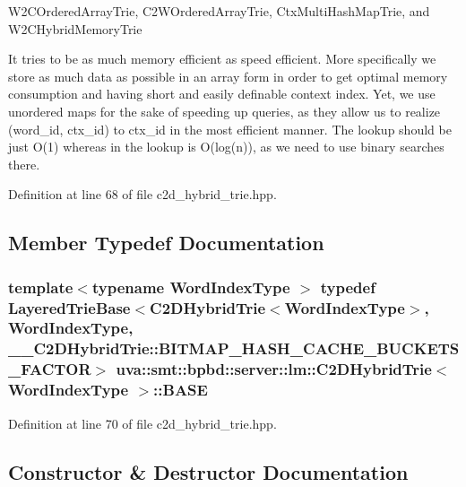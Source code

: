 W2\+C\+Ordered\+Array\+Trie, C2\+W\+Ordered\+Array\+Trie, Ctx\+Multi\+Hash\+Map\+Trie, and W2\+C\+Hybrid\+Memory\+Trie

It tries to be as much memory efficient as speed efficient. More specifically we store as much data as possible in an array form in order to get optimal memory consumption and having short and easily definable context index. Yet, we use unordered maps for the sake of speeding up queries, as they allow us to realize (word\+\_\+id, ctx\+\_\+id) to ctx\+\_\+id in the most efficient manner. The lookup should be just O(1) whereas in the lookup is O(log(n)), as we need to use binary searches there. 

Definition at line 68 of file c2d\+\_\+hybrid\+\_\+trie.\+hpp.



\subsection{Member Typedef Documentation}
\hypertarget{classuva_1_1smt_1_1bpbd_1_1server_1_1lm_1_1_c2_d_hybrid_trie_ab01d9acc9e19bcebd085a9772187807f}{}
\subsubsection[{B\+A\+S\+E}]{\setlength{\rightskip}{0pt plus 5cm}template$<$typename Word\+Index\+Type $>$ typedef {\bf Layered\+Trie\+Base}$<${\bf C2\+D\+Hybrid\+Trie}$<${\bf Word\+Index\+Type}$>$, {\bf Word\+Index\+Type}, \+\_\+\+\_\+\+C2\+D\+Hybrid\+Trie\+::\+B\+I\+T\+M\+A\+P\+\_\+\+H\+A\+S\+H\+\_\+\+C\+A\+C\+H\+E\+\_\+\+B\+U\+C\+K\+E\+T\+S\+\_\+\+F\+A\+C\+T\+O\+R$>$ {\bf uva\+::smt\+::bpbd\+::server\+::lm\+::\+C2\+D\+Hybrid\+Trie}$<$ {\bf Word\+Index\+Type} $>$\+::{\bf B\+A\+S\+E}}\label{classuva_1_1smt_1_1bpbd_1_1server_1_1lm_1_1_c2_d_hybrid_trie_ab01d9acc9e19bcebd085a9772187807f}


Definition at line 70 of file c2d\+\_\+hybrid\+\_\+trie.\+hpp.



\subsection{Constructor \& Destructor Documentation}
\hypertarget{classuva_1_1smt_1_1bpbd_1_1server_1_1lm_1_1_c2_d_hybrid_trie_a3c75a586203214fdd0044a6225cfcec7}{}
